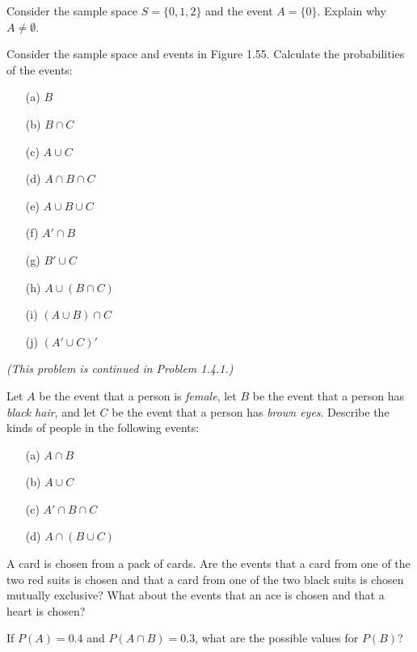 \documentclass[10pt, twocolumn]{article}
\begin{document}
\begin{description}[font=\bfseries, labelindent=0pt, leftmargin=3.5em]
    \item[1.3.1] Consider the sample space $S = \{0, 1, 2\}$ and the event $A = \{0\}$. Explain why $A \neq \emptyset$.

    \item[1.3.2] Consider the sample space and events in Figure 1.55. Calculate the probabilities of the events:
    \begin{multicols}{2}
    \begin{itemize}[label=]
        \item[(a)] $B$
        \item[(b)] $B \cap C$
        \item[(c)] $A \cup C$
        \item[(d)] $A \cap B \cap C$
        \item[(e)] $A \cup B \cup C$
        \item[(f)] $A' \cap B$
        \item[(g)] $B' \cup C$
        \item[(h)] $A \cup (B \cap C)$
        \item[(i)] $(A \cup B) \cap C$
        \item[(j)] $(A' \cup C)'$
    \end{itemize}
    \end{multicols}
    \textit{(This problem is continued in Problem 1.4.1.)}

    \item[1.3.4] Let $A$ be the event that a person is \textit{female}, let $B$ be the event that a person has \textit{black hair}, and let $C$ be the event that a person has \textit{brown eyes}. Describe the kinds of people in the following events:
    \begin{multicols}{2}
    \begin{itemize}[label=]
        \item[(a)] $A \cap B$
        \item[(b)] $A \cup C$
        \item[(c)] $A' \cap B \cap C$
        \item[(d)] $A \cap (B \cup C)$
    \end{itemize}
    \end{multicols}

    \item[1.3.5] A card is chosen from a pack of cards. Are the events that a card from one of the two red suits is chosen and that a card from one of the two black suits is chosen mutually exclusive?  What about the events that an ace is chosen
and that a heart is chosen?
    \item[1.3.6]If $P(A) = 0.4$ and $P(A \cap B) = 0.3$, what are the possible values for $P(B)$?
\end{description}
\end{document}
